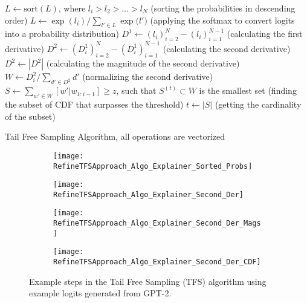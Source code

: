 \documentclass{article}
\begin{document}
\begin{algorithm}[H]
    \DontPrintSemicolon
    \SetAlgoLined
    $L \gets \text{sort}(L)$, where $l_i > l_2 > \ldots > l_N$ (sorting the probabilities in descending order)\;
    $L \gets \exp(l_i)/\sum_{l' \in L}{\exp(l'})$ (applying the softmax to convert logits into a probability distribution)\; 
    $D^1 \gets (l_i)_{i=2}^N - (l_i)_{i=1}^{N-1}$ (calculating the first derivative)\;
    $D^2 \gets (D^1_i)_{i=2}^N - (D^1_i)_{i=1}^{N-1}$ (calculating the second derivative)\;
    $D^2 \gets |D^2|$ (calculating the magnitude of the second derivative)\;
    $W \gets D^2_i/\sum_{d'\in D^2}{d'}$ (normalizing the second derivative)\;
    $S \gets \sum_{w' \in W}[{w'|w_{1:i-1}}]\ge z$, such that $S^{(t)} \subset W$  is the smallest set (finding the subset of CDF that surpasses the threshold)\;
    $t \gets |S|$ (getting the cardinality of the subset)\;
    \caption{Tail Free Sampling Algorithm, all operations are vectorized}
    \label{alg:TFSAlgorithm}
\end{algorithm}

\begin{figure}[h]
  \begin{subfigure}{.5\textwidth}
    \centering
    \texttt{[image: RefineTFSApproach\_Algo\_Explainer\_Sorted\_Probs]}
  \end{subfigure}
  \hfill
  \begin{subfigure}{.5\textwidth}
    \centering
    \texttt{[image: RefineTFSApproach\_Algo\_Explainer\_Second\_Der]}
  \end{subfigure}

  \medskip

  \begin{subfigure}[t]{0.5\textwidth}
    \centering
    \texttt{[image: RefineTFSApproach\_Algo\_Explainer\_Second\_Der\_Mags]}
  \end{subfigure}
  \hfill
  \begin{subfigure}[t]{0.5\textwidth}
    \centering
    \texttt{[image: RefineTFSApproach\_Algo\_Explainer\_Second\_Der\_CDF]}
  \end{subfigure}
  \caption{Example steps in the Tail Free Sampling (TFS) algorithm using example logits generated from GPT-2. }
  \label{fig:TFSApproachExplainer}
\end{figure}
\end{document}
